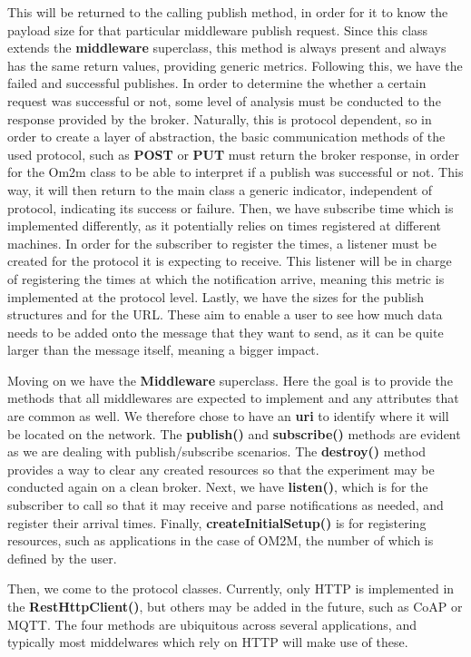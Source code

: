\documentclass[conference]{IEEEtran}
\begin{document}
This will be returned to the calling publish method, in order for it to know the payload size for that particular middleware publish request. Since this class extends the \textbf{middleware} superclass, this method is always present and always has the same return values, providing generic metrics.
Following this, we have the failed and successful publishes. In order to determine the whether a certain request was successful or not, some level of analysis must be conducted to the response provided by the broker. Naturally, this is protocol dependent, so in order to create a layer of abstraction, the basic communication methods of the used protocol, such as \textbf{POST} or \textbf{PUT} must return the broker response, in order for the Om2m class to be able to interpret if a publish was successful or not. This way, it will then return to the main class a generic indicator, independent of protocol, indicating its success or failure. 
Then, we have subscribe time which is implemented differently, as it potentially relies on times registered at different machines. In order for the subscriber to register the times, a listener must be created for the protocol it is expecting to receive. This listener will be in charge of registering the times at which the notification arrive, meaning this metric is implemented at the protocol level. Lastly, we have the sizes for the publish structures and for the URL\@. These aim to enable a user to see how much data needs to be added onto the message that they want to send, as it can be quite larger than the message itself, meaning a bigger impact.

Moving on we have the \textbf{Middleware} superclass. Here the goal is to provide the methods that all middlewares are expected to implement and any attributes that are common as well. We therefore chose to have an \textbf{uri} to identify where it will be located on the network. The \textbf{publish()} and \textbf{subscribe()} methods are evident as we are dealing with publish/subscribe scenarios. The \textbf{destroy()} method provides a way to clear any created resources so that the experiment may be conducted again on a clean broker. Next, we have \textbf{listen()}, which is for the subscriber to call so that it may receive and parse notifications as needed, and register their arrival times. Finally, \textbf{createInitialSetup()} is for registering resources, such as applications in the case of OM2M, the number of which is defined by the user.

Then, we come to the protocol classes. Currently, only HTTP is implemented in the \textbf{RestHttpClient()}, but others may be added in the future, such as CoAP or MQTT\@. The four methods are ubiquitous across several applications, and typically most middelwares which rely on HTTP will make use of these. 
\end{document}
